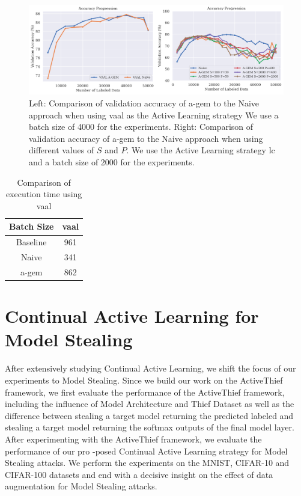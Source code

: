 \begin{figure}[h]
    \centering
    \includegraphics[width=\linewidth]{images/results_CAL/AGEM_plots.png}
    \caption[Continual Active Learning Custom Replay strategy]{Left: Comparison of validation accuracy of \gls{a-gem} to the Naive approach when using \gls{vaal} as the Active Learning strategy We use a batch size of 4000 for the experiments. Right: Comparison of validation accuracy of \gls{a-gem}
     to the Naive approach when using different values of $S$ and $P$. We use the Active Learning strategy \gls{lc} and a batch size of 2000 for the experiments.}
    \label{fig:Evaluation:Results:CAL:AGEM}
\end{figure}


\begin{table}[h]
    \centering
    \begin{tabular}{c | c } 
        Batch Size & \gls{vaal}\\ 
        \hline 
        Baseline & 961 \\
        Naive & 341 \\
        \gls{a-gem} & 862 \\
    \end{tabular}
    \caption{Comparison of execution time using \gls{vaal}}
    \label{fig:Evaluation:CAL:VAAL_AGEM_Time}
\end{table}

\section{Continual Active Learning for Model Stealing}
\label{sec:Evaluation:Results:MS}
After extensively studying Continual Active Learning, we shift the focus of our experiments to Model Stealing. Since we build our work on the ActiveThief framework, we first evaluate the performance of the ActiveThief framework, including the influence of Model Architecture and
Thief Dataset as well as the difference between stealing a target model returning the predicted labeled and stealing a target model returning the softmax outputs of the final model layer. After experimenting with the ActiveThief framework, we evaluate the performance of our pro
-posed Continual Active Learning strategy for Model Stealing attacks. We perform the experiments on the MNIST, CIFAR-10 and CIFAR-100 datasets and end with a decisive insight on the effect of data augmentation for Model Stealing attacks. \par


